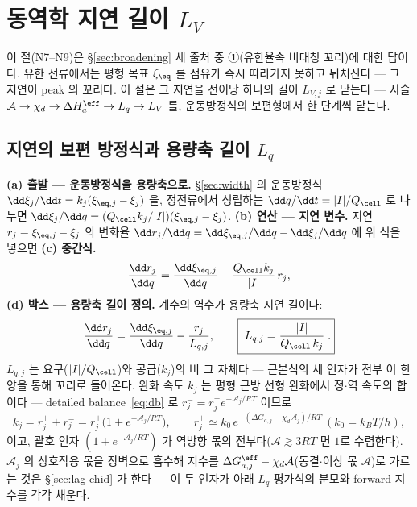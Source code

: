 \section{동역학 지연 길이 $L_V$}\label{sec:lag}
이 절(N7--N9)은 \S\ref{sec:broadening} 세 출처 중 ①(유한율속 비대칭 꼬리)에 대한 답이다. 유한 전류에서는 평형
목표 $\xi_\eq$ 를 점유가 즉시 따라가지 못하고 뒤처진다 --- 그 지연이 peak 의 꼬리다. 이 절은 그 지연을 전이당 하나의 길이 $L_{V,j}$ 로 닫는다 --- 사슬
$\mathcal A\to\chi_d\to\Delta H_a^\eff\to L_q\to L_V$ 를, 운동방정식의 보편형에서 한 단계씩 닫는다.

\subsection{지연의 보편 방정식과 용량축 길이 $L_q$}\label{sec:lag-Lq}
\textbf{(a) 출발 --- 운동방정식을 용량축으로.} \S\ref{sec:width} 의 운동방정식 $\dd\xi_j/\dd t=k_j(\xi_{\eq,j}-\xi_j)$
을, 정전류에서 성립하는 $\dd q/\dd t=|I|/Q_\cell$ 로 나누면 $\dd\xi_j/\dd q=(Q_\cell k_j/|I|)(\xi_{\eq,j}-\xi_j)$.
\textbf{(b) 연산 --- 지연 변수.} 지연 $r_j\equiv\xi_{\eq,j}-\xi_j$ 의 변화율 $\dd r_j/\dd q=\dd\xi_{\eq,j}/\dd q-\dd\xi_j/\dd q$
에 위 식을 넣으면 \textbf{(c) 중간식.}
\begin{equation}
\frac{\dd r_j}{\dd q}=\frac{\dd\xi_{\eq,j}}{\dd q}-\frac{Q_\cell k_j}{|I|}\,r_j,
\label{eq:Lqmid}
\end{equation}
\textbf{(d) 박스 --- 용량축 길이 정의.} 계수의 역수가 용량축 지연 길이다:
\begin{equation}
\frac{\dd r_j}{\dd q}=\frac{\dd\xi_{\eq,j}}{\dd q}-\frac{r_j}{L_{q,j}},
\qquad \boxed{\;L_{q,j}=\frac{|I|}{Q_\cell\,k_j}\;.}
\label{eq:Lq}
\end{equation}
$L_{q,j}$ 는 요구($|I|/Q_\cell$)와 공급($k_j$)의 비 그 자체다 --- 근본식의 세 인자가 전부 이 한 양을 통해 꼬리로
들어온다. 완화 속도 $k_j$ 는 평형 근방 선형 완화에서 정$\cdot$역 속도의 합이다 --- detailed balance~\eqref{eq:db} 로
$r_j^-=r_j^+e^{-\mathcal A_j/RT}$ 이므로
\begin{equation}
k_j=r_j^++r_j^-=r_j^+\big(1+e^{-\mathcal A_j/RT}\big),
\qquad r_j^+\simeq k_0\,e^{-(\Delta G_{a,j}-\chi_d\mathcal A_j)/RT}\ (k_0=k_BT/h),
\label{eq:kuniv}
\end{equation}
이고, 괄호 인자 $(1+e^{-\mathcal A_j/RT})$ 가 역방향 몫의 전부다($\mathcal A\gtrsim3RT$ 면 $1$로 수렴한다).
$\mathcal A_j$ 의 상호작용 몫을 장벽으로 흡수해 지수를 $\Delta G_{a,j}^\eff-\chi_d\mathcal A$(동결$\cdot$이상 몫
$\mathcal A$)로 가르는 것은 \S\ref{sec:lag-chid} 가 한다 --- 이 두 인자가 아래 $L_q$ 평가식의 분모와
forward 지수를 각각 채운다.


